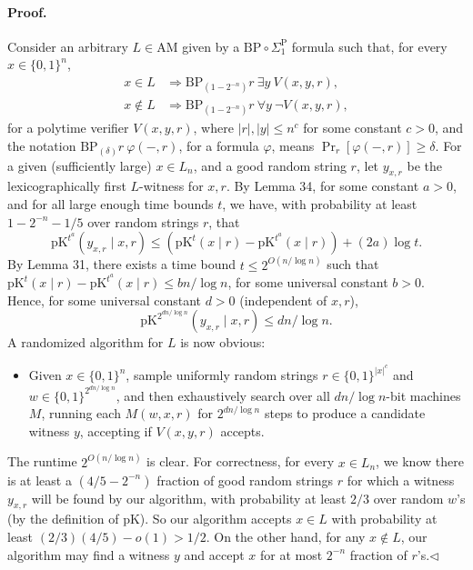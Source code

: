\paragraph{Proof.} Consider an arbitrary $L\in\mathrm{AM}$ given by a $\mathrm{BP}\circ\Sigma_1^{\mathrm P}$ formula such that, for every $x\in\{0,1\}^n$,
\begin{align*}
x\in L&\Longrightarrow\mathrm{BP}_{(1-2^{-n})}r\ \exists y\ V(x,y,r),\\
x\notin L&\Longrightarrow\mathrm{BP}_{(1-2^{-n})}r\ \forall y\ \neg V(x,y,r),
\end{align*}
for a polytime verifier $V(x,y,r)$, where $|r|,|y|\leq n^c$ for some constant $c>0$, and the notation $\mathrm{BP}_{(\delta)}r\ \varphi(-,r)$, for a formula $\varphi$, means $\Pr_r[\varphi(-,r)]\geq\delta$.
For a given (sufficiently large) $x\in L_n$, and a good random string $r$, let $y_{x,r}$ be the lexicographically first $L$-witness for $x,r$. By Lemma 34, for some constant $a>0$, and for all large enough time bounds $t$, we have, with probability at least $1-2^{-n}-1/5$ over random strings $r$, that
\[\mathrm{pK}^{t^a}(y_{x,r}\mid x,r)\leq(\mathrm{pK}^t(x\mid r)-\mathrm{pK}^{t^a}(x\mid r))+(2a)\log t.\]
By Lemma 31, there exists a time bound $t\leq2^{O(n/\log n)}$ such that $\mathrm{pK}^t(x\mid r)-\mathrm{pK}^{t^a}(x\mid r)\leq bn/\log n$, for some universal constant $b>0$. Hence, for some universal constant $d>0$ (independent of $x,r$),
\[\mathrm{pK}^{2^{dn/\log n}}(y_{x,r}\mid x,r)\leq dn/\log n.\]
A randomized algorithm for $L$ is now obvious:
\begin{itemize}
\item Given $x\in\{0,1\}^n$, sample uniformly random strings $r\in\{0,1\}^{|x|^c}$ and $w\in\{0,1\}^{2^{dn/\log n}}$, and then exhaustively search over all $dn/\log n$-bit machines $M$, running each $M(w,x,r)$ for $2^{dn/\log n}$ steps to produce a candidate witness $y$, accepting if $V(x,y,r)$ accepts.
\end{itemize}
The runtime $2^{O(n/\log n)}$ is clear. For correctness, for every $x\in L_n$, we know there is at least a $(4/5-2^{-n})$ fraction of good random strings $r$ for which a witness $y_{x,r}$ will be found by our algorithm, with probability at least $2/3$ over random $w$'s (by the definition of pK). So our algorithm accepts $x\in L$ with probability at least $(2/3)(4/5)-o(1)>1/2$. On the other hand, for any $x\notin L$, our algorithm may find a witness $y$ and accept $x$ for at most $2^{-n}$ fraction of $r$'s.\hfill$\triangleleft$
